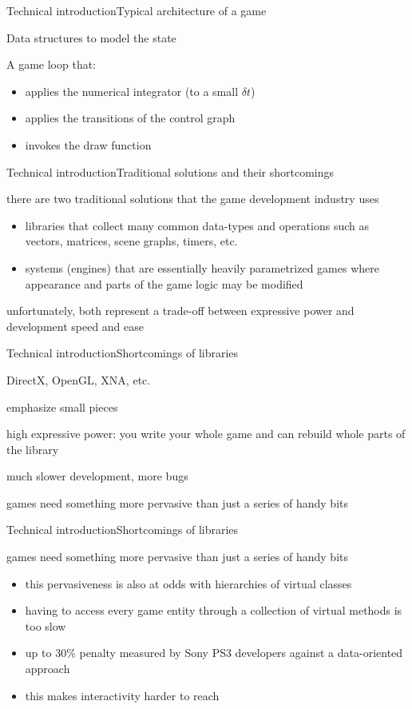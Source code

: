 \documentclass{beamer}
\begin{document}
\begin{slide}{Technical introduction}{Typical architecture of a game}{
\item Data structures to model the state
\item A game loop that:
\begin{itemize}
\item applies the numerical integrator (to a small $\delta t$)
\item applies the transitions of the control graph
\item invokes the draw function
\end{itemize}
}\end{slide}


\begin{slide}{Technical introduction}{Traditional solutions and their shortcomings}{
\item there are two traditional solutions that the game development industry uses
\begin{itemize}
\item libraries that collect many common data-types and operations such as vectors, matrices, scene graphs, timers, etc.
\item systems (engines) that are essentially heavily parametrized games where appearance and parts of the game logic may be modified
\end{itemize}
\item unfortunately, both represent a trade-off between expressive power and development speed and ease
}\end{slide}


\begin{slide}{Technical introduction}{Shortcomings of libraries}{
\item DirectX, OpenGL, XNA, etc.
\item emphasize small pieces
\item high expressive power: you write your whole game and can rebuild whole parts of the library
\item much slower development, more bugs
\item games need something more pervasive than just a series of handy bits
}\end{slide}


\begin{slide}{Technical introduction}{Shortcomings of libraries}{
\item games need something more pervasive than just a series of handy bits
\begin{itemize}
\item this pervasiveness is also at odds with hierarchies of virtual classes
\item having to access every game entity through a collection of virtual methods is too slow
\item up to 30\% penalty measured by Sony PS3 developers against a data-oriented approach
\item this makes interactivity harder to reach
\end{itemize}
}\end{slide}
\end{document}
